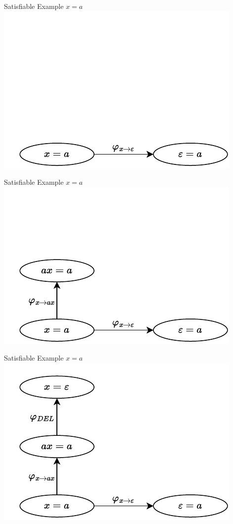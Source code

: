 \documentclass[xcolor=table]{beamer}
\begin{document}
\begin{frame}{Satisfiable Example $x = a$}
\includegraphics[]{images/x_a/x_a-2.pdf}
\end{frame}

\begin{frame}{Satisfiable Example $x = a$}
\includegraphics[]{images/x_a/x_a-3.pdf}
\end{frame}

\begin{frame}{Satisfiable Example $x = a$}
\includegraphics[]{images/x_a/x_a-4.pdf}
\end{frame}
\end{document}

